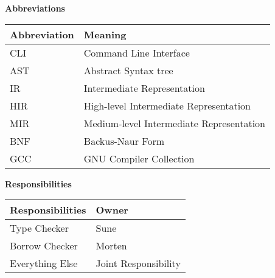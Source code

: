 \begin{center}
\textbf{Abbreviations}
\begin{table}[H]
  \centering
  \label{tab:}
  \begin{tabular}{|p{5cm}|p{5cm}|}
    \hline
    Abbreviation & Meaning\\
    \hline
    CLI & Command Line Interface\\
    \hline
    AST & Abstract Syntax tree\\
    \hline
    IR & Intermediate Representation\\
    \hline
    HIR & High-level Intermediate Representation \\
    \hline
    MIR & Medium-level Intermediate Representation \\
    \hline
    BNF & Backus-Naur Form \\
    \hline 
    GCC & GNU Compiler Collection \\
    \hline
  \end{tabular}
\end{table}

\textbf{Responsibilities}
\begin{table}[H]
  \centering
  \label{tab:}
  \begin{tabular}{|p{5cm}|p{5cm}|}
    \hline
    Responsibilities & Owner \\
    \hline
    Type Checker & Sune\\
    \hline
    Borrow Checker & Morten\\
    \hline
    Everything Else & Joint Responsibility\\
    \hline
  \end{tabular}
\end{table}
\end{center}


\newpage
